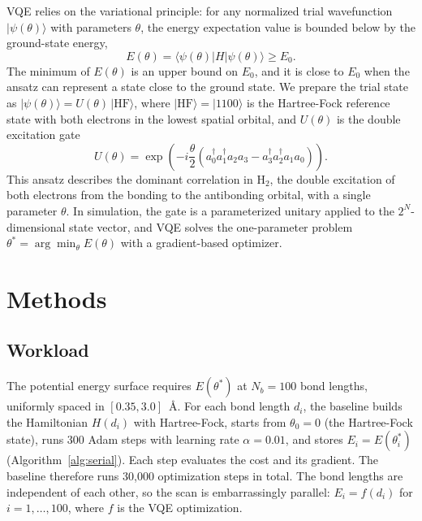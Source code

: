 \documentclass[11pt]{article}
\begin{document}
VQE relies on the variational principle: for any normalized trial wavefunction $|\psi(\theta)\rangle$ with parameters $\theta$, the energy expectation value is bounded below by the ground-state energy,
\begin{equation}
    E(\theta) = \langle \psi(\theta) | H | \psi(\theta) \rangle \geq E_0 .
\end{equation}
The minimum of $E(\theta)$ is an upper bound on $E_0$, and it is close to $E_0$ when the ansatz can represent a state close to the ground state. We prepare the trial state as $|\psi(\theta)\rangle = U(\theta)\,|\text{HF}\rangle$, where $|\text{HF}\rangle = |1100\rangle$ is the Hartree-Fock reference state with both electrons in the lowest spatial orbital, and $U(\theta)$ is the double excitation gate
\begin{equation}
    U(\theta) = \exp\left(-i\frac{\theta}{2}\left(a_0^\dagger a_1^\dagger a_2 a_3 - a_3^\dagger a_2^\dagger a_1 a_0\right)\right).
\end{equation}
This ansatz describes the dominant correlation in H$_2$, the double excitation of both electrons from the bonding to the antibonding orbital, with a single parameter $\theta$. In simulation, the gate is a parameterized unitary applied to the $2^N$-dimensional state vector, and VQE solves the one-parameter problem $\theta^* = \arg\min_\theta E(\theta)$ with a gradient-based optimizer.

\section{Methods}
\label{sec:methods}

\subsection{Workload}

The potential energy surface requires $E(\theta^*)$ at $N_b = 100$ bond lengths, uniformly spaced in $[0.35, 3.0]$~\AA. For each bond length $d_i$, the baseline builds the Hamiltonian $H(d_i)$ with Hartree-Fock, starts from $\theta_0 = 0$ (the Hartree-Fock state), runs 300 Adam steps with learning rate $\alpha = 0.01$, and stores $E_i = E(\theta^*_i)$ (Algorithm~\ref{alg:serial}). Each step evaluates the cost and its gradient. The baseline therefore runs 30,000 optimization steps in total. The bond lengths are independent of each other, so the scan is embarrassingly parallel: $E_i = f(d_i)$ for $i = 1, \ldots, 100$, where $f$ is the VQE optimization.
\end{document}

